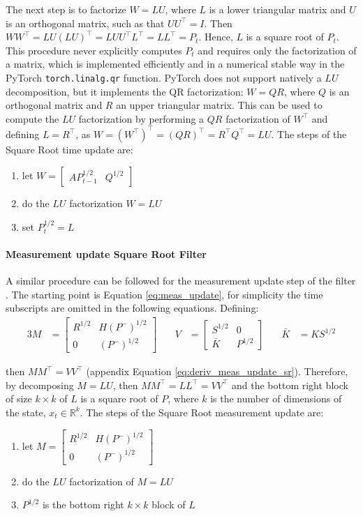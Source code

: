 \documentclass{article}
\begin{document}
The next step is to factorize  $W=LU$, where $L$ is a lower triangular matrix and $U$ is an orthogonal matrix, such as that $UU^\top = I$. Then $WW^\top = LU(LU)^\top = LUU^\top L^\top = LL^\top=P_t$. Hence, $L$ is a square root of $P_t$.
This procedure never explicitly computes $P_t$ and requires only the factorization of a matrix, which is implemented efficiently and in a numerical stable way in the \textsf{PyTorch} \verb|torch.linalg.qr| function.
PyTorch does not support natively a $LU$ decomposition, but it implements the QR factorization: $W=QR$, where $Q$ is an orthogonal matrix and $R$ an upper triangular matrix. This can be used to compute the $LU$ factorization by performing a $QR$ factorization of $W^\top$ and defining $L = R^\top$, as $W=(W^\top)^\top=(QR)^\top=R^\top Q^\top=LU$.
The steps of the Square Root time update are:

\begin{enumerate}
    \item let  $W = \begin{bmatrix}AP_{t-1}^{1/2} & Q^{1/2}\end{bmatrix}$
    \item do the $LU$ factorization $W=LU$
    \item set $P_t^{1/2} = L$
\end{enumerate}

\paragraph{Measurement update Square Root Filter} A similar procedure can be followed for the measurement update step of the filter \cite{dan_simon_optimal_2006}. The starting point is Equation \ref{eq:meas_update}, for simplicity the time subscripts are omitted in the following equations. Defining:
\begin{alignat*}{3}
    M &= \begin{bmatrix} R^{1/2} & H(P^-)^{1/2} \\ 0 & (P^-)^{1/2} \end{bmatrix} \quad &
    V &= \begin{bmatrix} S^{1/2} & 0 \\ \bar{K} & P^{1/2} \end{bmatrix} \quad&
    \bar{K} &= KS^{1/2}
\end{alignat*}

then $MM^\top = VV^\top$ (appendix Equation \ref{eq:deriv_meas_update_sr}). Therefore, by decomposing $M=LU$, then $MM^\top=LL^\top=VV^\top$ and the bottom right block of size $k \times k$ of $L$ is a square root of $P$, where $k$ is the number of dimensions of the state, $x_t \in \mathbb{R}^k$.
The steps of the Square Root measurement update are:
\begin{enumerate}
 \item let $M = \begin{bmatrix} R^{1/2} & H(P^-)^{1/2} \\ 0 & (P^-)^{1/2} \end{bmatrix}$
 \item do the $LU$ factorization of $M=LU$
 \item $P^{1/2}$ is the bottom right $k \times k$ block of $L$
\end{enumerate}
\end{document}
